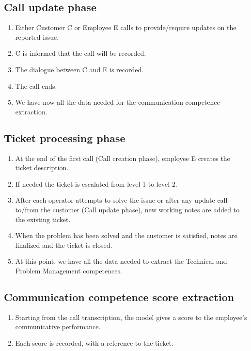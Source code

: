 \subsection{Call update phase}

\begin{enumerate}
      \item Either Customer C or Employee E calls to provide/require updates on the reported issue.
      \item C is informed that the call will be recorded.
      \item The dialogue between C and E is recorded.
      \item The call ends.
      \item We have now all the data needed for the communication competence extraction.
\end{enumerate}

\subsection{Ticket processing phase}

\begin{enumerate}
      \item At the end of the first call (Call creation phase), employee E creates the ticket description.
      \item If needed the ticket is escalated from level 1 to level 2.
      \item After each operator attempts to solve the issue or after any update call to/from the customer (Call update phase), new working notes are added to the existing ticket.
      \item When the problem has been solved and the customer is satisfied, notes are finalized and the ticket is closed.
      \item At this point, we have all the data needed to extract the Technical and Problem Management competences.
\end{enumerate}

\subsection{Communication competence score extraction}

\begin{enumerate}
      \item Starting from the call transcription, the model gives a score to the employee's communicative performance.
      \item Each score is recorded, with a reference to the ticket.
\end{enumerate}

